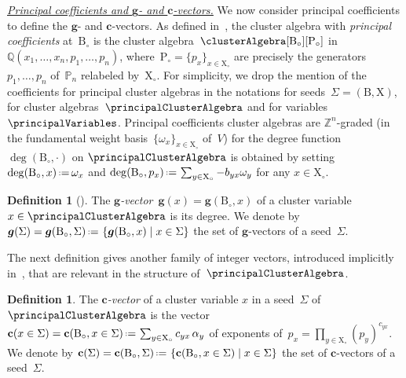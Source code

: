 \documentclass{amsart}
\theoremstyle{definition}
\newtheorem{definition}[theorem]{Definition}
\newcommand{\Q}{\mathbb{Q}} %
\newcommand{\Z}{\mathbb{Z}} %
\renewcommand{\b}[1]{{\boldsymbol{#1}}} %
\newcommand{\set}[2]{\left\{ #1 \;\middle|\; #2 \right\}} %
\newcommand{\eqdef}{\mbox{\,\raisebox{0.2ex}{\scriptsize\ensuremath{\mathrm:}}\ensuremath{=}\,}} %
\newcommand{\darkblue}{\color{darkblue}} %
\newcommand{\defn}[1]{\textsl{\darkblue #1}} %
\newcommand{\para}[1]{\medskip\noindent\uline{\textit{#1.}}} %
\newcommand{\gvector}[1]{\b{g}(#1)} %
\newcommand{\gvectorFull}[2]{\b{g}(#1,#2)} %
\newcommand{\gvectors}[1]{\b{g}(#1)} %
\newcommand{\cvector}[2]{\mathbf{c}(#2 \in #1)} %
\newcommand{\cvectorFull}[3]{\mathbf{c}(#1,#3 \in #2)} %
\newcommand{\cvectors}[1]{\mathbf{c}(#1)} %
\newcommand{\cvectorsFull}[2]{\mathbf{c}(#1,#2)} %
\newcommand{\Trop}[1]{\mathbb{P}_{#1}} %
\newcommand{\seed}{\Sigma} %
\newcommand{\cluster}{\mathrm{X}} %
\newcommand{\coefficients}{\mathrm{P}} %
\newcommand{\B}{\mathrm{B}} %
\newcommand{\simpleRoot}{\alpha} %
\newcommand{\fundamentalWeight}{\omega} %
\begin{document}
\para{Principal coefficients and $\b{g}$- and $\b{c}$-vectors}
%
We now consider principal coefficients to define the $\b{g}$- and $\b{c}$-vectors.
As defined in~\cite[Def.~3.1]{FominZelevinsky-ClusterAlgebrasIV}, the cluster algebra with \defn{principal coefficients} at~$\B_\circ$ is the cluster algebra~$\clusterAlgebra[\B_\circ][\coefficients_\circ]$ in~$\Q(x_1, \dots, x_n, p_1, \dots, p_n)$, where~$\coefficients_\circ = \{p_x\}_{x \in \cluster_\circ}$ are precisely the generators~$p_1, \dots, p_n$ of~$\Trop{n}$ relabeled by~$\cluster_\circ$.
For simplicity, we drop the mention of the coefficients for principal cluster algebras in the notations for seeds~$\seed = (\B, \cluster)$, for cluster algebras~$\principalClusterAlgebra$ and for variables~$\principalVariables$.
Principal coefficients cluster algebras are $\Z^n$-graded (in the fundamental weight basis~$\{\omega_x\}_{x \in \cluster_\circ}$ of~$V$) for the degree function~$\deg(\B_\circ,\cdot)$ on $\principalClusterAlgebra$ is obtained by setting
\(
\deg(\B_\circ,  x) \eqdef \fundamentalWeight_x
\)
and
\(
\deg(\B_\circ, p_x) \eqdef \sum_{y \in \cluster_\circ} -b_{yx} \fundamentalWeight_y
\)
for any $x\in\cluster_\circ$.

\begin{definition}[\cite{FominZelevinsky-ClusterAlgebrasIV}]
The \defn{$\b{g}$-vector}~$\gvector{x} = \gvectorFull{\B_\circ}{x}$ of a cluster variable~$x \in \principalClusterAlgebra$ is its degree.
We denote by $\gvectors{\seed} = \gvectorFull{\B_\circ}{\seed} \eqdef \set{\gvectorFull{\B_\circ}{x}}{x \in \seed}$ the set of $\b{g}$-vectors of a seed~$\seed$.
\end{definition}

The next definition gives another family of integer vectors, introduced implicitly in~\cite{FominZelevinsky-ClusterAlgebrasIV}, that are relevant in the structure of~$\principalClusterAlgebra$.

\begin{definition}
The \defn{$\b{c}$-vector} of a cluster variable $x$ in a seed~$\seed$ of~$\principalClusterAlgebra$ is the vector
\(
{\cvector{\seed}{x} = \cvectorFull{\B_\circ}{\seed}{x} \eqdef \sum_{y \in \cluster_\circ} c_{yx} \, \simpleRoot_y}
\)
of exponents of~$p_x = \prod_{y \in \cluster_\circ} (p_y)^{c_{yx}}$.
We denote by ${\cvectors{\seed} = \cvectorsFull{\B_\circ}{\seed} \eqdef \set{\cvectorFull{\B_\circ}{\seed}{x}}{x \in \seed}}$ the set of $\b{c}$-vectors of a seed~$\seed$.
\end{definition}
\end{document}
